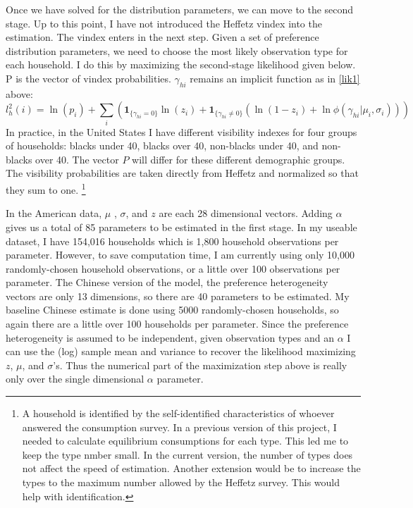 \documentclass[12pt]{article}
\begin{document}
Once we have solved for the distribution parameters, we can move to the second stage. 
Up to this point, I have not introduced the Heffetz vindex into the estimation. The vindex enters in the next step.
Given a set of preference distribution parameters, we need to choose the most likely observation type for each household. I do this by maximizing the second-stage likelihood given below.
P is the vector of vindex probabilities.  $\gamma_{hi}$ remains an implicit function as in \eqref{lik1} above:
\begin{equation}
    \label{lik2}
    l_h^2(i) = \ln(p_i) + \sum_{i} \left(\mathbf{1}_{\{\gamma_{hi} = 0\}}\ln\left(z_i\right) + \mathbf{1}_{\{\gamma_{hi} \neq 0\}} \left(\ln\left(1-z_i\right)+\ln \phi(\gamma_{hi}|\mu_i,\sigma_i)\right)\right)
\end{equation}
In practice, in the United States I have different visibility indexes for four groups of households: blacks under 40, blacks over 40, non-blacks under 40, and non-blacks over 40.
The vector $P$ will differ for these different demographic groups.
The visibility probabilities are taken directly from Heffetz and normalized so that they sum to one.
\footnote{A household is identified by the self-identified characteristics of whoever answered the consumption survey. 
In a previous version of this project, I needed to calculate equilibrium consumptions for each type.  This led me to keep the type nmber small.  In the current version, the number of types does not affect the speed of estimation.  Another extension would be to increase the types to the maximum number allowed by the Heffetz survey. This would help with identification.}

In the American data, $\mu$ , $\sigma$, and $z$ are each 28 dimensional vectors. Adding $\alpha$ gives us a total of 85 parameters to be estimated in the first stage.   
In my useable dataset, I have 154,016 households which is 1,800 household observations per parameter.
However, to save computation time, I am currently using only 10,000 randomly-chosen household observations, or a little over 100 observations per parameter.
The Chinese version of the model, the preference heterogeneity vectors are only 13 dimensions, so there are 40 parameters to be estimated.  My baseline Chinese estimate is done using 5000 randomly-chosen households, so again there are a little over 100 households per parameter.
Since the preference heterogeneity is assumed to be independent, given observation types and an $\alpha$ I can use the (log) sample mean and variance to recover the likelihood maximizing $z$, $\mu$, and $\sigma$'s.
Thus the numerical part of the maximization step above is really only over the single dimensional $\alpha$ parameter.
\end{document}
